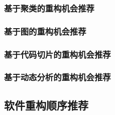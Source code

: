 \subsubsection{基于聚类的重构机会推荐}
\subsubsection{基于图的重构机会推荐}
\subsubsection{基于代码切片的重构机会推荐}
\subsubsection{基于动态分析的重构机会推荐}
\subsection{软件重构顺序推荐}
\fi
